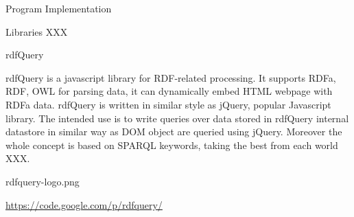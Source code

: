  
\chap Program Implementation

\sec Libraries XXX

\secc rdfQuery

rdfQuery is a javascript library for RDF-related processing. It supports RDFa,
RDF, OWL for parsing data, it can dynamically embed HTML webpage with RDFa
data. rdfQuery is written in similar style as jQuery, popular Javascript
library. The intended use is to write queries over data stored in rdfQuery
internal datastore in similar way as DOM object are queried using jQuery.
Moreover the whole concept is based on SPARQL keywords, taking the best from
each world XXX. 

\picw=1cm \cinspic rdfquery-logo.png

\url{https://code.google.com/p/rdfquery/}



